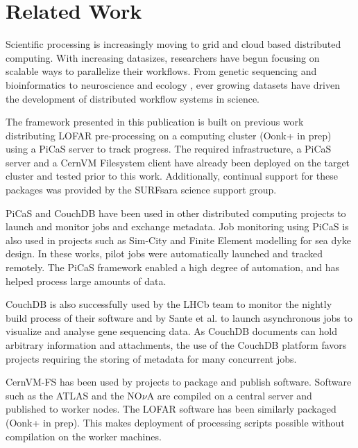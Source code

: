 \section{Related Work}

Scientific processing is increasingly moving to grid and cloud based distributed computing. With increasing datasizes, researchers have begun focusing on scalable ways to parallelize their workflows. From genetic sequencing \cite{scalable} and bioinformatics\cite{bioinfo} to neuroscience\cite{neurogrid} and ecology \cite{ecoinfo}, ever growing datasets have driven the development of distributed workflow systems in science\cite{pegasus}\cite{swift}. 

The framework presented in this publication is built on previous work distributing LOFAR pre-processing on a computing cluster (Oonk+ in prep) using a PiCaS server to track progress\cite{picas}. The required infrastructure, a PiCaS\cite{picas} server and a CernVM Filesystem client\cite{cvmfs2008} have already been deployed on the target cluster and tested prior to this work. Additionally, continual support for these packages was provided by the SURFsara science support group. 

PiCaS\cite{picas_git} and CouchDB\cite{couchdb} have been used in other distributed computing projects to launch and monitor jobs and exchange metadata. Job monitoring using PiCaS is also used in projects such as Sim-City\cite{simcity} and Finite Element modelling for sea dyke design\cite{li2017reliability}. In these works, pilot jobs were automatically launched and tracked remotely. The PiCaS framework enabled a high degree of automation, and has helped process large amounts of data.  

CouchDB is also successfully used by the LHCb team to monitor the nightly build process of their software\cite{clemencic2014new} and by Sante et al.\cite{sante2010development} to launch asynchronous jobs to visualize and analyse gene sequencing data. As CouchDB documents can hold arbitrary information and attachments, the use of the CouchDB platform favors projects requiring the storing of metadata for many concurrent jobs. 

CernVM-FS\cite{cvmfs2008} has been used by projects to package and publish software. Software such as the ATLAS \cite{cvmfsatlas} and the NO$\nu$A \cite{cvmfsnova} are compiled on a central server and published to worker nodes. The LOFAR software has been similarly packaged (Oonk+ in prep). This makes deployment of processing scripts possible without compilation on the worker machines. 

